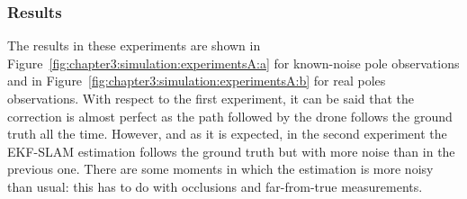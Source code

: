 \subsubsection{Results}
\label{subsubsec:chapter3:simulation:a:results}
The results in these experiments are shown in Figure~\ref{fig:chapter3:simulation:experimentsA:a} for known-noise pole observations and in Figure~\ref{fig:chapter3:simulation:experimentsA:b} for real poles observations. With respect to the first experiment, it can be said that the correction is almost perfect as the path followed by the drone follows the ground truth all the time. However, and as it is expected, in the second experiment the EKF-SLAM estimation follows the ground truth but with more noise than in the previous one. There are some moments in which the estimation is more noisy than usual: this has to do with occlusions and far-from-true measurements.
